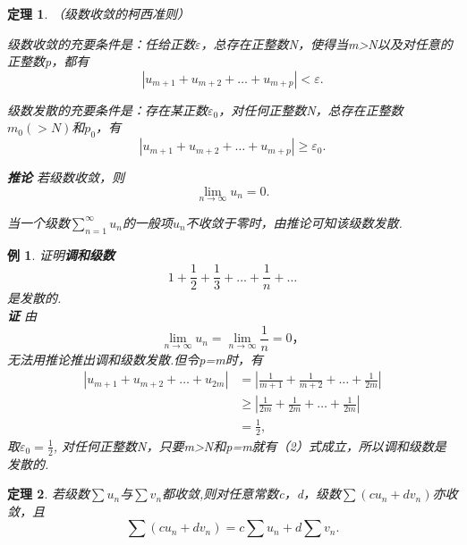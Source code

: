\documentclass[12pt, UTF8, AutoFakeBold]{ctexart} %
\newtheorem{theorem}{定理}[section]
\newtheorem{example}{例}[section]
\newcommand{\limn}{\lim_{n\to\infty}} %
\begin{document}
\begin{tcolorbox}[colback=yellow!20, colframe=red!80!black]
    \begin{theorem}
        （级数收敛的柯西准则）

        级数收敛的充要条件是：任给正数$\varepsilon$，总存在正整数N，使得当m>N以及对任意的正整数p，都有
        \begin{equation}
            |u_{m+1} + u_{m+2} + \dots + u_{m+p}| < \varepsilon. \tag{1}
        \end{equation}

        级数发散的充要条件是：存在某正数$\varepsilon_0$，对任何正整数N，总存在正整数$m_0(>N)$和$p_0$，有
        \begin{equation}
            |u_{m+1} + u_{m+2} + \dots + u_{m+p}| \geq  \varepsilon_0. \tag{2}
        \end{equation}

        \textbf{推论} 若级数收敛，则
        \[
            \lim\limits_{n \to \infty} u_n = 0.
        \]

            当一个级数$\sum\limits_{n = 1}^{\infty}u_n$的一般项$u_n$不收敛于零时，由推论可知该级数发散.
    \end{theorem}
\end{tcolorbox}

\begin{example}
    证明\textbf{\kaishu 调和级数}
    \[
        1 + \frac{1}{2} + \frac{1}{3} + \dots + \frac{1}{n} + \dots
    \]
    是发散的.\\
    \textbf{证} 由
    \[
        \limn u_n = \limn \frac{1}{n} = 0，
    \]
    无法用推论推出调和级数发散.但令p=m时，有
    \[
    \begin{aligned}
        |u_{m+1} + u_{m+2} + \dots + u_{2m}| &= \left|\frac{1}{m + 1} + \frac{1}{m + 2} + \dots + \frac{1}{2m}\right|\\
        &\geq \left|\frac{1}{2m} + \frac{1}{2m} + \dots + \frac{1}{2m}\right|\\
        &= \frac{1}{2},
    \end{aligned}
    \]
    取$\varepsilon_0 = \frac{1}{2}$, 对任何正整数N，只要m>N和p=m就有（2）式成立，所以调和级数是发散的.
\end{example}

\begin{theorem}
    若级数$\sum u_n$与$\sum v_n$都收敛,则对任意常数c，d，级数$\sum (cu_n+dv_n)$亦收敛，且
    \[
        \sum (cu_n+dv_n) = c\sum u_n+d\sum v_n.
    \]
\end{theorem}
\end{document}
